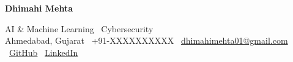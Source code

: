 \begin{center}
   {\Huge \textbf{Dhimahi Mehta}}

    {\normalsize AI \& Machine Learning \textbar\ Cybersecurity}\\[4pt]

    \small
    Ahmedabad, Gujarat \textbar\
    +91-XXXXXXXXXX \textbar\
    \href{mailto:dhimahimehta01@gmail.com}{dhimahimehta01@gmail.com} \textbar\
    \href{https://github.com/Dhimahi-T-Mehta}{GitHub} \textbar\
    \href{https://www.linkedin.com/in/dhimahi-mehta-8b9221316}{LinkedIn}
\end{center}